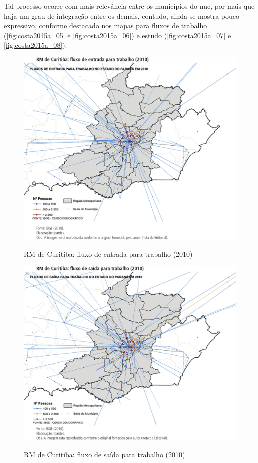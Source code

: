 	Tal processo ocorre com mais relevância entre os municípios do \gls{nuc}, por mais que haja um grau de integração entre os demais, contudo, ainda se mostra pouco expressivo, conforme destacado nos mapas para fluxos de trabalho (\autoref{fig:costa2015a_05} e \autoref{fig:costa2015a_06}) e estudo (\autoref{fig:costa2015a_07} e \autoref{fig:costa2015a_08}).
	
	\begin{figure}
		\centering
		\caption{RM de Curitiba: fluxo de entrada para trabalho (2010)}
		\includegraphics[width=1.0\linewidth]{img/costa2015a_05}
		\label{fig:costa2015a_05}
	\end{figure}

	\begin{figure}
		\centering
		\caption{RM de Curitiba: fluxo de saída para trabalho (2010)}
		\includegraphics[width=1.0\linewidth]{img/costa2015a_06}
		\label{fig:costa2015a_06}
	\end{figure}
	
